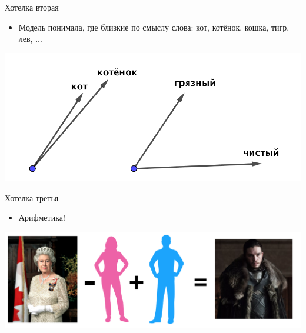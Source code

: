 \documentclass[notes,12pt, aspectratio=169]{beamer}
\begin{document}
\begin{frame}{Хотелка вторая}
\begin{itemize} 
\item Модель понимала, где близкие по смыслу слова: кот, котёнок, кошка, тигр, лев, ...	
\end{itemize} 


\begin{center}
\includegraphics[width=.7\linewidth]{w2v_dist.png}
\end{center}
\end{frame} 


\begin{frame}{Хотелка третья}
\begin{itemize} 
\item Арифметика! 
\end{itemize} 

\begin{center}
\includegraphics[width=.8\linewidth]{w2v_arith.png}
\end{center}
\end{frame} 
\end{document}
